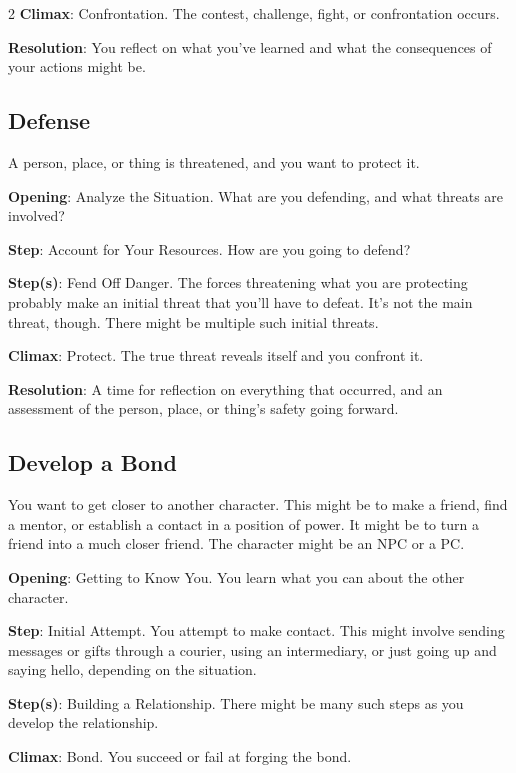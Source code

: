 \begin{multicols}{2}
\textbf{Climax}: Confrontation. The contest, challenge, fight, or confrontation occurs. 

\textbf{Resolution}: You reflect on what you’ve learned and what the consequences of your actions might be.

\subsection{Defense}

A person, place, or thing is threatened, and you want to protect it.

\textbf{Opening}: Analyze the Situation. What are you defending, and what threats are involved?

\textbf{Step}: Account for Your Resources. How are you going to defend?

\textbf{Step(s)}: Fend Off Danger. The forces threatening what you are protecting probably make an initial threat that you’ll have to defeat. It’s not the main threat, though. There might be multiple such initial threats.

\textbf{Climax}: Protect. The true threat reveals itself and you confront it. 

\textbf{Resolution}: A time for reflection on everything that occurred, and an assessment of the person, place, or thing’s safety going forward.

\subsection{Develop a Bond}

You want to get closer to another character. This might be to make a friend, find a mentor, or establish a contact in a position of power. It might be to turn a friend into a much closer friend. The character might be an NPC or a PC.

\textbf{Opening}: Getting to Know You. You learn what you can about the other character.

\textbf{Step}: Initial Attempt. You attempt to make contact. This might involve sending messages or gifts through a courier, using an intermediary, or just going up and saying hello, depending on the situation.

\textbf{Step(s)}: Building a Relationship. There might be many such steps as you develop the relationship.

\textbf{Climax}: Bond. You succeed or fail at forging the bond. 


\end{multicols}
